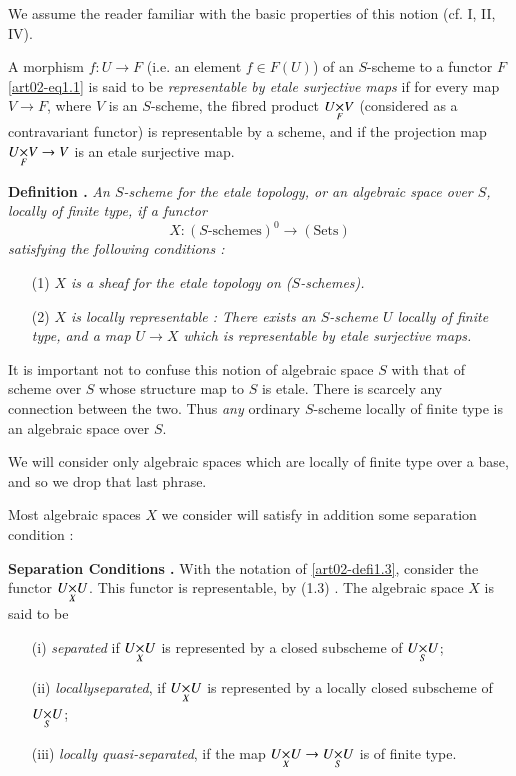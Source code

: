 \vfill\eject

We assume the reader familiar with the basic properties of this notion (cf. \cite{art02-key6} I, II, \cite{art02-key7} IV).

A morphism $f:U\to F$ (i.e. an element $f\in F(U)$) of an $S$-scheme to a functor $F$ \eqref{art02-eq1.1} is said to be {\em representable by etale surjective maps} if for every map $V\to F$, where $V$ is an $S$-scheme, the fibred product $\fprod{U}{V}{F}$ (considered as a contravariant functor) is representable by a scheme, and if the projection map $\fprod{U}{V}{F}\to V$ is an etale surjective map.

\medskip
\noindent
{\bf Definition .\label{art02-defi1.3}}
{\em An $S$-scheme for the etale topology, or an algebraic space over $S$, locally of finite type, if a functor}
$$
X:(S\text{-schemes})^{0}\to (\text{Sets})
$$
{\em satisfying the following conditions :}
\begin{itemize}
\item[\rm(1)] {\em $X$ is a sheaf for the etale topology on ($S$-schemes).}

\item[\rm(2)] {\em $X$ is locally representable : There exists an $S$-scheme $U$ locally of finite type, and a map $U\to X$ which is representable by etale surjective maps.}
\end{itemize}

It is important not to confuse this notion of algebraic space $S$ with that of scheme over $S$ whose structure map to $S$ is etale. There is scarcely any connection between the two. Thus {\em any} ordinary $S$-scheme locally of finite type is an algebraic space over $S$.

We will consider only algebraic spaces which are locally of finite type over a base, and so we drop that last phrase.

Most algebraic spaces $X$ we consider will satisfy in addition some separation condition :

\medskip
\noindent
{\bf Separation Conditions .\label{art02-sc1.4}}
With the notation of \eqref{art02-defi1.3}, consider the functor $\fprod{U}{U}{X}$. This functor is representable, by (1.3) \cite{art02-key2}. The algebraic space $X$ is said to be
\begin{itemize}
\item[(i)] {\em separated} if $\fprod{U}{U}{X}$ is represented by a closed subscheme of $\fprod{U}{U}{S}$;

\item[(ii)] {\em locally\pageoriginale separated}, if $\fprod{U}{U}{X}$ is represented by a locally closed subscheme of $\fprod{U}{U}{S}$;

\item[(iii)] {\em locally quasi-separated}, if the map $\fprod{U}{U}{X}\to \fprod{U}{U}{S}$ is of finite type.
\end{itemize}

